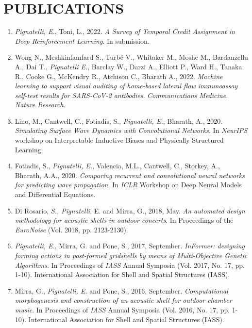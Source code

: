 \section*{PUBLICATIONS}
\begin{enumerate}[leftmargin=0.45cm, itemsep=0em, topsep=0.5em, parsep=0.2em]
    \item \emph{Pignatelli, E.}, Toni, L., 2022. \textit{A Survey of Temporal Credit Assignment in Deep Reinforcement Learning}. In submission.
    \item Wong N., Meshkinfamfard S., Turbé V., Whitaker M., Moshe M., Bardanzellu A., Dai T., \emph{Pignatelli E.}, Barclay W., Darzi A., Elliott P., Ward H., Tanaka R., Cooke G., McKendry R., Atchison C., Bharath A., 2022. \textit{Machine learning to support visual auditing of home-based lateral flow immunoassay self-test results for SARS-CoV-2 antibodies}. \emph{Communications Medicine. Nature Research}.
    \item Lino, M., Cantwell, C., Fotiadis, S., \emph{Pignatelli, E.}, Bharath, A., 2020. \textit{Simulating Surface Wave Dynamics with Convolutional Networks}. In \emph{NeurIPS} workshop on Interpretable Inductive Biases and Physically Structured Learning.
    \item Fotiadis, S., \emph{Pignatelli, E.}, Valencia, M.L., Cantwell, C., Storkey, A., Bharath, A.A., 2020. \textit{Comparing recurrent and convolutional neural networks for predicting wave propagation}. In \emph{ICLR} Workshop on Deep Neural Models and Differential Equations.
    \item Di Rosario, \emph{S., Pignatelli}, E. and Mirra, G., 2018, May. \textit{An automated design methodology for acoustic shells in outdoor concerts}. In Proceedings of the \emph{EuroNoise} (Vol. 2018, pp. 2123-2130).
    \item \emph{Pignatelli, E.}, Mirra, G. and Pone, S., 2017, September. \textit{InFormer: designing forming actions in post-formed gridshells by means of Multi-Objective Genetic Algorithms}. In Proceedings of \emph{IASS} Annual Symposia (Vol. 2017, No. 17, pp. 1-10). International Association for Shell and Spatial Structures (IASS).
    \item Mirra, G., \emph{Pignatelli, E.} and Pone, S., 2016, September. \textit{Computational morphogenesis and construction of an acoustic shell for outdoor chamber music}. In Proceedings of \emph{IASS} Annual Symposia (Vol. 2016, No. 17, pp. 1-10). International Association for Shell and Spatial Structures (IASS).

\end{enumerate}
